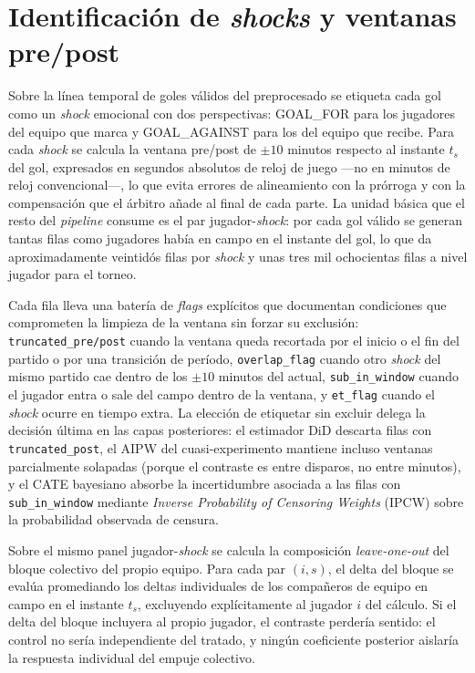\section{Identificación de \textit{shocks} y ventanas pre/post}
\label{sec:shocks-ventanas}

Sobre la línea temporal de goles válidos del preprocesado se etiqueta
cada gol como un \textit{shock} emocional con dos perspectivas: GOAL\_FOR
para los jugadores del equipo que marca y GOAL\_AGAINST para los del
equipo que recibe. Para cada \textit{shock} se calcula la ventana
pre/post de $\pm 10$ minutos respecto al instante $t_s$ del gol,
expresados en segundos absolutos de reloj de juego ---no en minutos
de reloj convencional---, lo que evita errores de alineamiento con la
prórroga y con la compensación que el árbitro añade al final de cada
parte. La unidad básica que el resto del \textit{pipeline} consume es
el par jugador-\textit{shock}: por cada gol válido se generan tantas
filas como jugadores había en campo en el instante del gol, lo que da
aproximadamente veintidós filas por \textit{shock} y unas tres mil
ochocientas filas a nivel jugador para el torneo.

Cada fila lleva una batería de \textit{flags} explícitos que
documentan condiciones que comprometen la limpieza de la ventana sin
forzar su exclusión: \texttt{truncated\_pre/post} cuando la ventana
queda recortada por el inicio o el fin del partido o por una
transición de período, \texttt{overlap\_flag} cuando otro
\textit{shock} del mismo partido cae dentro de los $\pm 10$ minutos
del actual, \texttt{sub\_in\_window} cuando el jugador entra o sale
del campo dentro de la ventana, y \texttt{et\_flag} cuando el
\textit{shock} ocurre en tiempo extra. La elección de etiquetar
sin excluir delega la decisión última en las capas posteriores: el
estimador DiD descarta filas con
\texttt{truncated\_post}, el AIPW del cuasi-experimento mantiene
incluso ventanas parcialmente solapadas (porque el contraste es entre
disparos, no entre minutos), y el CATE bayesiano absorbe la
incertidumbre asociada a las filas con \texttt{sub\_in\_window}
mediante \textit{Inverse Probability of Censoring Weights} (IPCW)
sobre la probabilidad observada de censura.

Sobre el mismo panel jugador-\textit{shock} se calcula la composición
\textit{leave-one-out} del bloque colectivo del propio equipo. Para
cada par $(i, s)$, el delta del bloque se evalúa promediando los
deltas individuales de los compañeros de equipo en campo en el
instante $t_s$, excluyendo explícitamente al jugador $i$ del cálculo.
Si el delta del bloque incluyera al propio jugador, el contraste
perdería sentido: el control no sería independiente del tratado, y
ningún coeficiente posterior aislaría la respuesta individual del
empuje colectivo.


